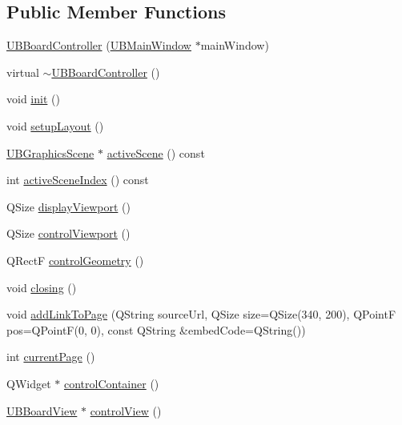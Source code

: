 \subsection*{Public Member Functions}
\begin{DoxyCompactItemize}
\item 
\hyperlink{class_u_b_board_controller_a6d5d5894174958720c91e1e1f19b150f}{U\-B\-Board\-Controller} (\hyperlink{class_u_b_main_window}{U\-B\-Main\-Window} $\ast$main\-Window)
\item 
virtual \hyperlink{class_u_b_board_controller_aa769a722df15b23e797b84da38db3d81}{$\sim$\-U\-B\-Board\-Controller} ()
\item 
void \hyperlink{class_u_b_board_controller_aa728cb7c1b979b2d4ae45638a7386dde}{init} ()
\item 
void \hyperlink{class_u_b_board_controller_a6d2e9c5462d58eaddbe0ee3f70661053}{setup\-Layout} ()
\item 
\hyperlink{class_u_b_graphics_scene}{U\-B\-Graphics\-Scene} $\ast$ \hyperlink{class_u_b_board_controller_a5bf93ad343de7f09150d634ef3a8c459}{active\-Scene} () const 
\item 
int \hyperlink{class_u_b_board_controller_a82e3690c789dc021cdb134e3704c7b7a}{active\-Scene\-Index} () const 
\item 
Q\-Size \hyperlink{class_u_b_board_controller_a4d1d29ce392c83f191f0e46af3f8827f}{display\-Viewport} ()
\item 
Q\-Size \hyperlink{class_u_b_board_controller_ad0b66f7f22704b350af880fc771d0c9a}{control\-Viewport} ()
\item 
Q\-Rect\-F \hyperlink{class_u_b_board_controller_ae06dc14d88bdbbe27552a4363c77d368}{control\-Geometry} ()
\item 
void \hyperlink{class_u_b_board_controller_a5d7e796ca2cd932cf3827fa79231a4c0}{closing} ()
\item 
void \hyperlink{class_u_b_board_controller_a5f701f4cd3173743effca3b3b0bd4615}{add\-Link\-To\-Page} (Q\-String source\-Url, Q\-Size size=Q\-Size(340, 200), Q\-Point\-F pos=Q\-Point\-F(0, 0), const Q\-String \&embed\-Code=Q\-String())
\item 
int \hyperlink{class_u_b_board_controller_aa0f5ffcfa77210bbadb4c9650db4e074}{current\-Page} ()
\item 
Q\-Widget $\ast$ \hyperlink{class_u_b_board_controller_a5c56052dfab48a72f8ee4d5cd90391d4}{control\-Container} ()
\item 
\hyperlink{class_u_b_board_view}{U\-B\-Board\-View} $\ast$ \hyperlink{class_u_b_board_controller_ab71662c63aac8470984b04499e906d3a}{control\-View} ()

\end{DoxyCompactItemize}

